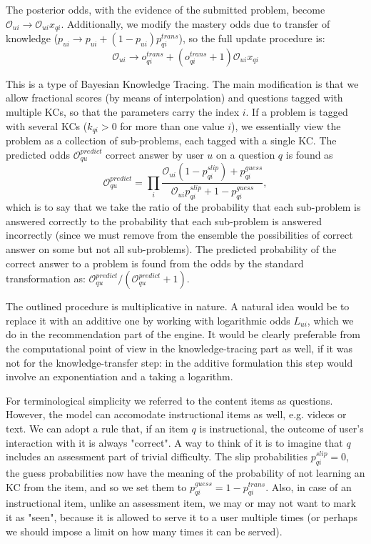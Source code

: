 \documentclass{sigchi}
\newcommand{\1}{\mathbf{1}}
\newcommand{\be}{\begin{equation}}
\newcommand{\ee}{\end{equation}}
\begin{document}
The posterior odds, with the evidence of the submitted problem, become $\mathcal{O}_{ui}\to \mathcal{O}_{ui}x_{qi}$. Additionally, we modify the mastery odds due to transfer of knowledge ($p_{ui}\to p_{ui}+(1-p_{ui})p^{trans}_{qi}$), so 
the full update procedure is:
\be \mathcal{O}_{ui}\to o_{qi}^{trans} + (o_{qi}^{trans}+1)\mathcal{O}_{ui}x_{qi}\label{BKT}\ee

This is a type of Bayesian Knowledge Tracing. The main modification is that we allow fractional scores (by means of interpolation) and questions tagged with multiple KCs, so that the parameters carry the index $i$. If a problem is tagged with several KCs ($k_{qi}>0$ for more than one value $i$), we essentially view the problem as a collection of sub-problems, each tagged with a single KC. The predicted odds $\mathcal{O}_{qu}^{predict}$ correct answer by user $u$ on a question $q$ is found as
\be \mathcal{O}_{qu}^{predict}=\prod_i\frac{\mathcal{O}_{ui}(1-p_{qi}^{slip})+p_{qi}^{guess}}{\mathcal{O}_{ui}p_{qi}^{slip}+1-p_{qi}^{guess}},\ee
which is to say that we take the ratio of the probability that each sub-problem is answered correctly to the probability that each sub-problem is answered incorrectly (since we must remove from the ensemble the possibilities of correct answer on some but not all sub-problems). The predicted probability of the correct answer to a problem is found from the odds by the standard transformation as: $\mathcal{O}_{qu}^{predict}/(\mathcal{O}_{qu}^{predict}+1)$.

The outlined procedure is multiplicative in nature. A natural idea would be to replace it with an additive one by working with logarithmic odds $L_{ui}$, which we do in the recommendation part of the engine. It would be clearly preferable from the computational point of view in the knowledge-tracing part as well, if it was not for the knowledge-transfer step: in the additive formulation this step would involve an exponentiation and a taking a logarithm.

For terminological simplicity we referred to the content items as questions. However, the model can accomodate instructional items as well, e.g. videos or text. We can adopt a rule that, if an item $q$ is instructional, the outcome of user's interaction with it is always "correct". A way to think of it is to imagine that $q$ includes an assessment part of trivial difficulty. The slip probabilities $p_{qi}^{slip}=0$, the guess probabilities now have the meaning of the probability of not learning an KC from the item, and so we set them to $p_{qi}^{guess}=1-p_{qi}^{trans}$. Also, in case of an instructional item, unlike an assessment item, we may or may not want to mark it as "seen", because it is allowed to serve it to a user multiple times (or perhaps we should impose a limit on how many times it can be served).
\end{document}

